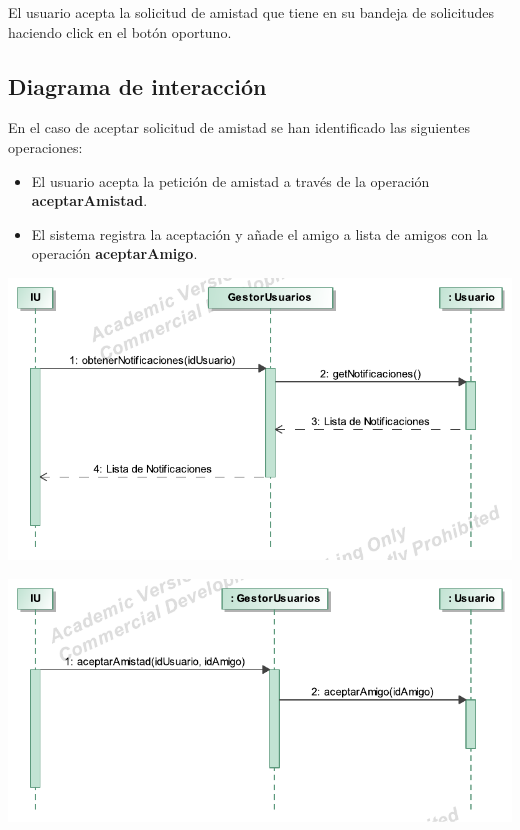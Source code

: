 \documentclass[12pt, a4paper, titlepage]{article}
\begin{document}
El usuario acepta la solicitud de amistad que tiene en su bandeja de solicitudes haciendo click en el botón oportuno.

\subsection{Diagrama de interacción}

En el caso de {\sc aceptar solicitud de amistad } se han identificado las siguientes operaciones:

\begin{itemize}
	\item El usuario acepta la petición de amistad a través de la operación \textbf{aceptarAmistad}.
	\item El sistema registra la aceptación y añade el amigo a lista de amigos con la operación \textbf{aceptarAmigo}.
\end{itemize}

\begin{center}
	\includegraphics{Imagenes/OperacionObtenerNotificaciones}
\end{center}

\begin{center}
	\includegraphics{Imagenes/OperacionAceptarAmistad}
\end{center}
\end{document}
